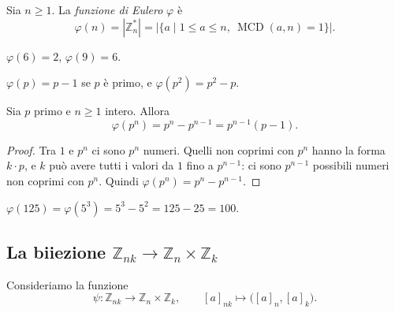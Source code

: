 \documentclass[11pt,a4paper]{article}
\begin{document}
\begin{definizione}
Sia $n \ge 1$. La \emph{funzione di Eulero} $\varphi$ è
\[
  \varphi(n) = |\mathbb{Z}_n^*| = \Big|\big\{ a \mid 1 \le a \le n,\ \operatorname{MCD}(a, n) = 1 \big\}\Big| .
\]
\end{definizione}

\begin{esempio}
$\varphi(6) = 2$, \qquad $\varphi(9) = 6$.
\end{esempio}

\begin{osservazione}
$\varphi(p) = p - 1$ se $p$ è primo, e $\varphi(p^2) = p^2 - p$.
\end{osservazione}

\begin{proposizione}
Sia $p$ primo e $n \ge 1$ intero. Allora
\[
  \varphi(p^n) = p^n - p^{n-1} = p^{n-1}(p - 1) .
\]
\end{proposizione}

\begin{proof}
Tra $1$ e $p^n$ ci sono $p^n$ numeri. Quelli non coprimi con $p^n$ hanno la forma $k\cdot p$, e $k$ può avere tutti i valori da $1$ fino a $p^{n-1}$: ci sono $p^{n-1}$ possibili numeri non coprimi con $p^n$. Quindi $\varphi(p^n) = p^n - p^{n-1}$.
\end{proof}

\begin{esempio}
$\varphi(125) = \varphi(5^3) = 5^3 - 5^2 = 125 - 25 = 100$.
\end{esempio}

\subsection{La biiezione $\mathbb{Z}_{nk} \to \mathbb{Z}_n \times \mathbb{Z}_k$}

Consideriamo la funzione
\[
  \psi : \mathbb{Z}_{nk} \to \mathbb{Z}_n \times \mathbb{Z}_k, \qquad [a]_{nk} \mapsto \big([a]_n, [a]_k\big).
\]
\end{document}
